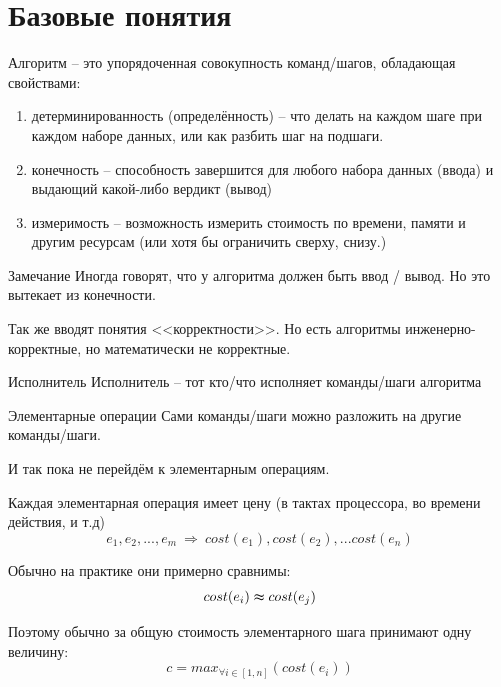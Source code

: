 \section{Базовые понятия}\label{section:base_alg}

\begin{frame}{Алгоритм}
	\footnotesize
{} -- это упорядоченная совокупность команд/шагов,
обладающая свойствами:
\begin{enumerate}
	\item детерминированность (определённость) -- что делать на каждом шаге при каждом наборе данных, или как разбить шаг на подшаги.
	\item конечность -- способность завершится для любого набора данных (ввода) и выдающий какой-либо вердикт (вывод)
	\item измеримость -- возможность измерить стоимость по времени, памяти и другим ресурсам (или хотя бы ограничить сверху, снизу.)
\end{enumerate}

\begin{block}{Замечание}
	Иногда говорят, что у алгоритма должен быть ввод / вывод. Но это вытекает из конечности.
	
	Так же вводят понятия <<корректности>>. Но есть алгоритмы инженерно-корректные, но математически не корректные.
\end{block}

\end{frame}


\begin{frame}{Исполнитель}
	Исполнитель -- тот кто/что исполняет команды/шаги алгоритма
	
	
\end{frame}


\begin{frame}{Элементарные операции}
	Сами команды/шаги можно разложить на другие команды/шаги.
	
	И так пока не перейдём к элементарным операциям.
	
	Каждая элементарная операция имеет цену (в тактах процессора, во времени действия, и т.д)
	\begin{equation}
	e_1, e_2, ..., e_m ~\Longrightarrow~ cost(e_1), cost(e_2), ... cost(e_n) 
	\end{equation}
	
	Обычно на практике они примерно сравнимы:
	\begin{equation}
	cost (e_i) \thickapprox cost (e_j)
	\end{equation}
	
	Поэтому обычно за общую стоимость элементарного шага принимают одну величину:
	\begin{equation}
	c = max_{\forall i \in [1, n]} (cost(e_i))
	\end{equation}
	
\end{frame}

